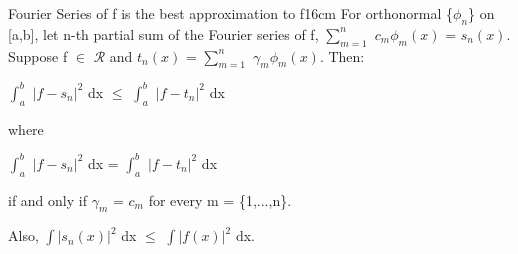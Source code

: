     \newpage



    \begin{wtheorem}{Fourier Series of f is the best approximation to f}{16cm}
        For orthonormal \{$\phi_n$\} on [a,b], let n-th partial sum of the
        Fourier series of f, $\sum_{m=1}^n$ $c_m \phi_m(x)$ = $s_n(x)$. 
        Suppose f $\in$ $\mathscr{R}$ and
        $t_n(x)$ = $\sum_{m=1}^n$ $\gamma_m \phi_m(x)$. Then:

        \hspace{0.5cm}
        $\int_a^b$ $|f - s_n|^2$ dx $\leq$ $\int_a^b$ $|f - t_n|^2$ dx

        where
        
        \hspace{0.5cm}
        $\int_a^b$ $|f - s_n|^2$ dx = $\int_a^b$ $|f - t_n|^2$ dx

        if and only if $\gamma_m$ = $c_m$ for every m = \{1,...,n\}.

        Also, $\int |s_n(x)|^2$ dx $\leq$ $\int |f(x)|^2$ dx.
    \end{wtheorem}

